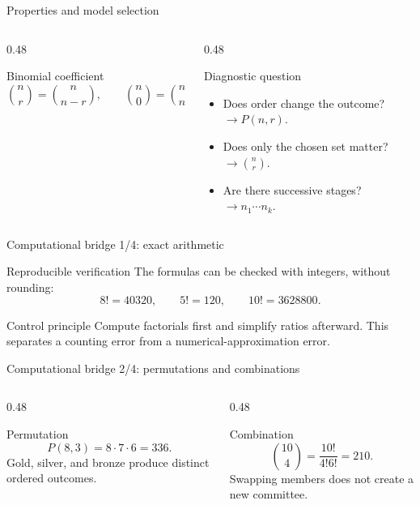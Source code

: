 \documentclass[10pt,aspectratio=169]{beamer}
\begin{document}
\begin{frame}{Properties and model selection}
  \footnotesize
  \begin{columns}[T]
    \begin{column}{0.48\textwidth}
      \begin{block}{Binomial coefficient}
        \[
          \binom{n}{r}=\binom{n}{n-r},\qquad
          \binom{n}{0}=\binom{n}{n}=1.
        \]
      \end{block}
    \end{column}
    \begin{column}{0.48\textwidth}
      \begin{alertblock}{Diagnostic question}
        \begin{itemize}\itemsep=0.05cm
          \item Does order change the outcome? $\to P(n,r)$.
          \item Does only the chosen set matter? $\to \binom{n}{r}$.
          \item Are there successive stages? $\to n_1\cdots n_k$.
        \end{itemize}
      \end{alertblock}
    \end{column}
  \end{columns}
\end{frame}

\begin{frame}{Computational bridge 1/4: exact arithmetic}
  \small
  \begin{block}{Reproducible verification}
    The formulas can be checked with integers, without rounding:
    \[
      8!=40320,\qquad 5!=120,\qquad 10!=3628800.
    \]
  \end{block}
  \begin{exampleblock}{Control principle}
    Compute factorials first and simplify ratios afterward. This separates a
    counting error from a numerical-approximation error.
  \end{exampleblock}
\end{frame}

\begin{frame}{Computational bridge 2/4: permutations and combinations}
  \footnotesize
  \begin{columns}[T]
    \begin{column}{0.48\textwidth}
      \begin{block}{Permutation}
        \[
          P(8,3)=8\cdot7\cdot6=336.
        \]
        Gold, silver, and bronze produce distinct ordered outcomes.
      \end{block}
    \end{column}
    \begin{column}{0.48\textwidth}
      \begin{block}{Combination}
        \[
          \binom{10}{4}=\frac{10!}{4!6!}=210.
        \]
        Swapping members does not create a new committee.
      \end{block}
    \end{column}
  \end{columns}
\end{frame}
\end{document}

